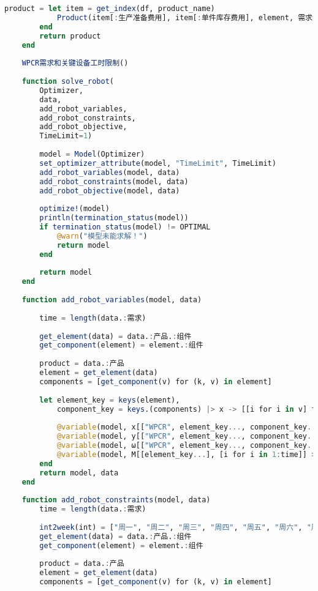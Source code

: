 \begin{appendices}
\begin{lstlisting}[language=julia]
        product = let item = get_index(df, product_name)
            Product(item[:生产准备费用], item[:单件库存费用], element, 需求量)
        end
        return product
    end
    
    WPCR需求和关键设备工时限制()
    
    function solve_robot(
        Optimizer,
        data,
        add_robot_variables,
        add_robot_constraints,
        add_robot_objective,
        TimeLimit=1)
    
        model = Model(Optimizer)
        set_optimizer_attribute(model, "TimeLimit", TimeLimit)
        add_robot_variables(model, data)
        add_robot_constraints(model, data)
        add_robot_objective(model, data)
    
        optimize!(model)
        println(termination_status(model))
        if termination_status(model) != OPTIMAL
            @warn("模型未能求解！")
            return model
        end
    
        return model
    end
    
    function add_robot_variables(model, data)
    
        time = length(data.:需求)
    
        get_element(data) = data.:产品.:组件
        get_component(element) = element.:组件
    
        product = data.:产品
        element = get_element(data)
        components = [get_component(v) for (k, v) in element]
    
        let element_key = keys(element),
            component_key = keys.(components) |> x -> [[i for i in v] for v in x] |> x -> vcat(x...)
    
            @variable(model, x[["WPCR", element_key..., component_key...], [i for i in 1:time]] >= 0, Int)
            @variable(model, y[["WPCR", element_key..., component_key...], [i for i in 1:time]] >= 0, Int)
            @variable(model, ω[["WPCR", element_key..., component_key...], [i for i in 1:time]], Bin)
            @variable(model, M[[element_key...], [i for i in 1:time]] >= 0, Int)
        end
        return model, data
    end
    
    function add_robot_constraints(model, data)
        time = length(data.:需求)
    
        int2week(int) = ["周一", "周二", "周三", "周四", "周五", "周六", "周日"][int]
        get_element(data) = data.:产品.:组件
        get_component(element) = element.:组件
    
        product = data.:产品
        element = get_element(data)
        components = [get_component(v) for (k, v) in element]
    

\end{lstlisting}
\end{appendices}
